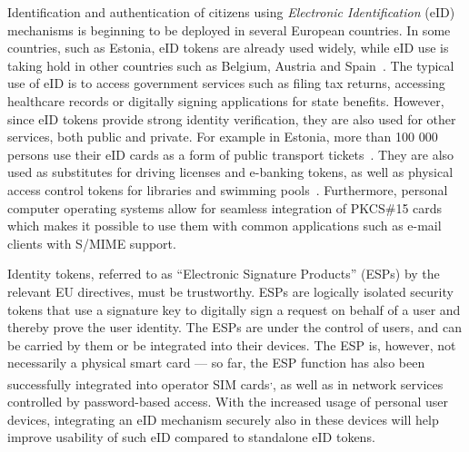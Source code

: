 \documentclass{sig-alternate-2013}
\begin{document}
Identification and authentication of citizens using \emph{Electronic
Identification} (eID) mechanisms is beginning to be deployed in several
European countries. In some countries, such as Estonia, eID tokens are
already used widely, while eID use is taking hold in other countries
such as Belgium, Austria and Spain~\cite{Martens10}. The typical use of
eID is to access government services such as filing tax returns,
accessing healthcare records or digitally signing applications for
state benefits. However, since eID tokens provide strong identity
verification, they are also used for other services, both public and
private. For example in Estonia, more than 100 000 persons use their
eID cards as a form of public transport tickets~\cite{Martens10}. They
are also used as substitutes for driving licenses and e-banking tokens,
as well as physical access control tokens for libraries and swimming
pools~\cite{Myhr08}. Furthermore, personal computer operating systems
allow for seamless integration of PKCS\#15 cards which makes it
possible to use them with common applications such as e-mail clients
with S/MIME support.

Identity tokens, referred to as ``Electronic Signature Products''
(ESPs) by the relevant EU directives, must be trustworthy. ESPs are
logically isolated security tokens that use a signature key to
digitally sign a request on behalf of a user and thereby prove the user
identity. The ESPs are under the control of users, and can be carried
by them or be integrated into their devices. The ESP is, however, not
necessarily a physical smart card --- so far, the ESP function has also
been successfully integrated into operator SIM
cards\footnotemark\textsuperscript{,}\footnotemark, as well as in
network services controlled by password-based access. With the
increased usage of personal user devices, integrating an eID mechanism
securely also in these devices will help improve usability of such eID
compared to standalone eID tokens.

\end{document}
